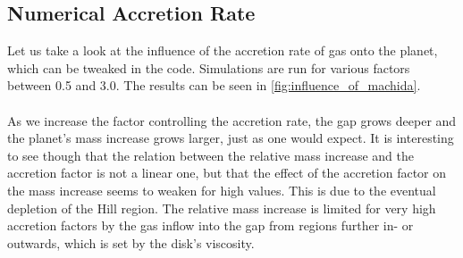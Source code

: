     \subsection{Numerical Accretion Rate}
      Let us take a look at the influence of the accretion rate of gas onto 
      the planet, which can be tweaked in the code. Simulations are run for 
      various factors between 0.5 and 3.0. The results can be seen in 
      \autoref{fig:influence_of_machida}. \\
      \\
      As we increase the factor controlling the accretion rate, the gap grows 
      deeper and the planet's mass increase grows larger, just as one would 
      expect. It is interesting to see though that the relation between the 
      relative mass increase and the accretion factor is not a linear one,
      but that the effect of the accretion factor on the mass increase 
      seems to weaken for high values. 
      This is due to the eventual depletion of the Hill region. The relative 
      mass increase is limited for very high accretion factors by the gas 
      inflow into the gap from regions further in- or outwards, which is set 
      by the disk's viscosity. 
